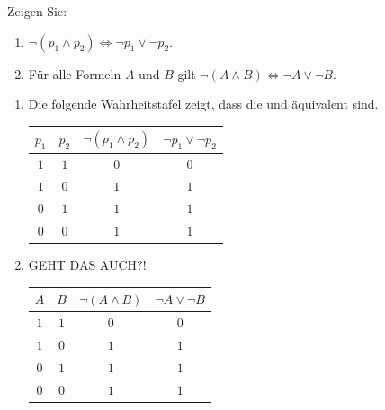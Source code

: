 
\begin{exercise}[18]

Zeigen Sie:

\begin{enumerate}[label = \alph*.]
    \item $\neg (p_1 \land p_2) \Leftrightarrow \neg p_1 \lor \neg p_2$.
    \item Für alle Formeln $A$ und $B$ gilt $\neg (A \land B) \Leftrightarrow \neg A \lor \neg B$.
\end{enumerate}

\end{exercise}


\begin{solution}

\phantom{}

\begin{enumerate}[label = \alph*]

    \item Die folgende Wahrheitstafel zeigt, dass die  und  äquivalent sind. \\

    \begin{tabular}{|c|c|c|c|}
        \hline
        $p_1$ & $p_2$ & $\neg (p_1 \land p_2)$ & $\neg p_1 \lor \neg p_2$ \\
        \hline
        $1$ & $1$ & $0$ & $0$ \\
        \hline
        $1$ & $0$ & $1$ & $1$ \\
        \hline
        $0$ & $1$ & $1$ & $1$ \\
        \hline
        $0$ & $0$ & $1$ & $1$ \\
        \hline
    \end{tabular}

    \item GEHT DAS AUCH?! \\

    \begin{tabular}{|c|c|c|c|}
        \hline
        $A$ & $B$ & $\neg (A \land B)$ & $\neg A \lor \neg B$ \\
        \hline
        $1$ & $1$ & $0$ & $0$ \\
        \hline
        $1$ & $0$ & $1$ & $1$ \\
        \hline
        $0$ & $1$ & $1$ & $1$ \\
        \hline
        $0$ & $0$ & $1$ & $1$ \\
        \hline
    \end{tabular}

\end{enumerate}

\end{solution}

